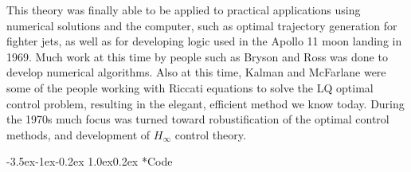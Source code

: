 \documentclass[11pt,letterpaper,onecolumn,notitlepage]{article}
\makeatletter
\newcommand{\codepath}{../include/code/hw1}
\renewcommand\section{\@startsection{section}{1}{\z@}%
{-3.5ex\@plus-1ex\@minus-0.2ex}%
{1.0ex\@plus0.2ex}%
{\fontsize{12pt}{12pt}\selectfont\bfseries\sffamily}}
\makeatother
\begin{document}
This theory was finally able to be applied to practical applications using numerical solutions and the computer, such as optimal trajectory generation for fighter jets, as well as for developing logic used in the Apollo 11 moon landing in 1969.
Much work at this time by people such as Bryson and Ross was done to develop numerical algorithms.
Also at this time, Kalman and McFarlane were some of the people working with Riccati equations to solve the LQ optimal control problem, resulting in the elegant, efficient method we know today.
During the 1970s much focus was turned toward robustification of the optimal control methods, and development of $H_{\infty}$ control theory.

\clearpage
\section*{Code}










\end{document}
